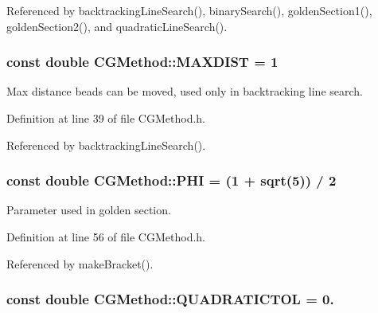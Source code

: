 Referenced by backtracking\+Line\+Search(), binary\+Search(), golden\+Section1(), golden\+Section2(), and quadratic\+Line\+Search().

\hypertarget{classCGMethod_a814ea57c3493f31f4ffd1cfa71795871}{
\subsubsection[{M\+A\+X\+D\+I\+S\+T}]{\setlength{\rightskip}{0pt plus 5cm}const double C\+G\+Method\+::\+M\+A\+X\+D\+I\+S\+T = 1\hspace{0.3cm}{\ttfamily [protected]}}}\label{classCGMethod_a814ea57c3493f31f4ffd1cfa71795871}


Max distance beads can be moved, used only in backtracking line search. 



Definition at line 39 of file C\+G\+Method.\+h.



Referenced by backtracking\+Line\+Search().

\hypertarget{classCGMethod_ab6ca0706dec56fe6e35f15f9791b3e23}{
\subsubsection[{P\+H\+I}]{\setlength{\rightskip}{0pt plus 5cm}const double C\+G\+Method\+::\+P\+H\+I = (1 + sqrt(5)) / 2\hspace{0.3cm}{\ttfamily [protected]}}}\label{classCGMethod_ab6ca0706dec56fe6e35f15f9791b3e23}


Parameter used in golden section. 



Definition at line 56 of file C\+G\+Method.\+h.



Referenced by make\+Bracket().

\hypertarget{classCGMethod_acd9c51fe93f6d563f731dd2e30eb7922}{
\subsubsection[{Q\+U\+A\+D\+R\+A\+T\+I\+C\+T\+O\+L}]{\setlength{\rightskip}{0pt plus 5cm}const double C\+G\+Method\+::\+Q\+U\+A\+D\+R\+A\+T\+I\+C\+T\+O\+L = 0.\hspace{0.3cm}{\ttfamily [protected]}}}\label{classCGMethod_acd9c51fe93f6d563f731dd2e30eb7922}


